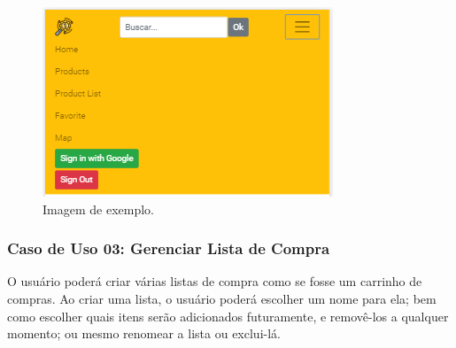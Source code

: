 \begin{figure}[!htb]
\centering
\caption{Imagem de exemplo.}
\includegraphics[width=\linewidth]{figuras/tela-menu.png}
\end{figure}

\subsubsection{Caso de Uso 03: Gerenciar Lista de Compra}

O usuário poderá criar várias listas de compra como se fosse um carrinho de compras. Ao criar uma lista, o usuário poderá escolher um nome para ela; bem como escolher quais itens serão adicionados futuramente, e removê-los a qualquer momento; ou mesmo renomear a lista ou exclui-lá.


